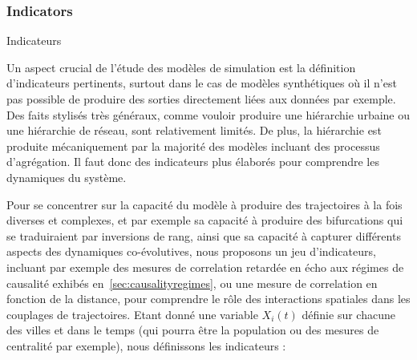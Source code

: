 \subsubsection{Indicators}{Indicateurs}

Un aspect crucial de l'étude des modèles de simulation est la définition d'indicateurs pertinents, surtout dans le cas de modèles synthétiques où il n'est pas possible de produire des sorties directement liées aux données par exemple. Des faits stylisés très généraux, comme vouloir produire une hiérarchie urbaine ou une hiérarchie de réseau, sont relativement limités. %
 De plus, la hiérarchie est produite mécaniquement par la majorité des modèles incluant des processus d'agrégation. Il faut donc des indicateurs plus élaborés pour comprendre les dynamiques du système.


Pour se concentrer sur la capacité du modèle à produire des trajectoires à la fois diverses et complexes, et par exemple sa capacité à produire des bifurcations qui se traduiraient par inversions de rang, ainsi que sa capacité à capturer différents aspects des dynamiques co-évolutives, nous proposons un jeu d'indicateurs, incluant par exemple des mesures de correlation retardée en écho aux régimes de causalité exhibés en~\ref{sec:causalityregimes}, ou une mesure de correlation en fonction de la distance, pour comprendre le rôle des interactions spatiales dans les couplages de trajectoires. Etant donné une variable $X_i(t)$ définie sur chacune des villes et dans le temps (qui pourra être la population ou des mesures de centralité par exemple), nous définissons les indicateurs :

